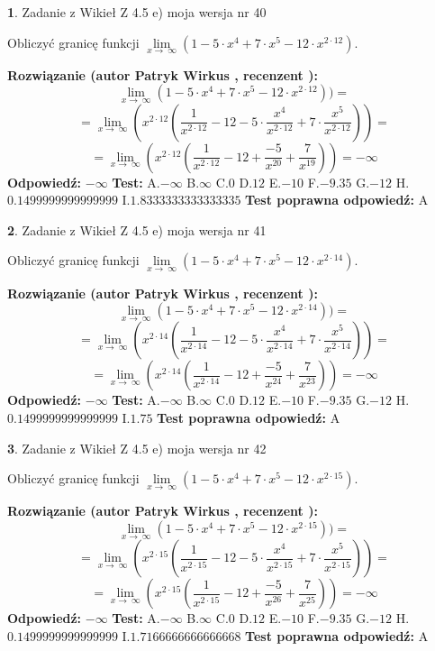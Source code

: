 \documentclass[12pt, a4paper]{article}
\theoremstyle{definition} %
\newtheorem{zad}{}
\newcommand{\zadStart}[1]{\begin{zad}#1\newline}
\newcommand{\zadStop}{\end{zad}}
\newcommand{\rozwStart}[2]{\noindent \textbf{Rozwiązanie (autor #1 , recenzent #2): }\newline}
\newcommand{\rozwStop}{\newline}
\newcommand{\odpStart}{\noindent \textbf{Odpowiedź:}\newline}
\newcommand{\odpStop}{\newline}
\newcommand{\testStart}{\noindent \textbf{Test:}\newline}
\newcommand{\testStop}{\newline}
\newcommand{\kluczStart}{\noindent \textbf{Test poprawna odpowiedź:}\newline}
\newcommand{\kluczStop}{\newline}
\begin{document}
\zadStart{Zadanie z Wikieł Z 4.5 e) moja wersja nr 40}


Obliczyć granicę funkcji  $\lim\limits_{x\to\ \infty}(1 - 5 \cdot x^{4}+7 \cdot x^{5}- 12 \cdot x^{2\cdot12})$.
\zadStop
\rozwStart{Patryk Wirkus}{}
$$\lim\limits_{x\to\ \infty}(1 - 5 \cdot x^{4}+7 \cdot x^{5}- 12 \cdot x^{2\cdot12}))=$$
$$=\lim\limits_{x\to\ \infty}(x^{2\cdot12}(\frac{1}{x^{2\cdot12}}-12 -5 \cdot \frac{x^{4}}{x^{2\cdot12}}+7 \cdot \frac{x^{5}}{x^{2\cdot12}}))=$$
$$=\lim\limits_{x\to\ \infty}(x^{2\cdot12}(\frac{1}{x^{2\cdot12}}-12 + \frac{-5}{x^{20}}+ \frac{7}{x^{19}}))=-\infty$$
\rozwStop
\odpStart
$-\infty$
\odpStop
\testStart
A.$-\infty$ B.$\infty$ C.$0$ D.$12$ E.$-10$
F.$-9.35$ G.$-12$
H.$0.1499999999999999$
I.$1.8333333333333335$
\testStop
\kluczStart
A
\kluczStop



\zadStart{Zadanie z Wikieł Z 4.5 e) moja wersja nr 41}


Obliczyć granicę funkcji  $\lim\limits_{x\to\ \infty}(1 - 5 \cdot x^{4}+7 \cdot x^{5}- 12 \cdot x^{2\cdot14})$.
\zadStop
\rozwStart{Patryk Wirkus}{}
$$\lim\limits_{x\to\ \infty}(1 - 5 \cdot x^{4}+7 \cdot x^{5}- 12 \cdot x^{2\cdot14}))=$$
$$=\lim\limits_{x\to\ \infty}(x^{2\cdot14}(\frac{1}{x^{2\cdot14}}-12 -5 \cdot \frac{x^{4}}{x^{2\cdot14}}+7 \cdot \frac{x^{5}}{x^{2\cdot14}}))=$$
$$=\lim\limits_{x\to\ \infty}(x^{2\cdot14}(\frac{1}{x^{2\cdot14}}-12 + \frac{-5}{x^{24}}+ \frac{7}{x^{23}}))=-\infty$$
\rozwStop
\odpStart
$-\infty$
\odpStop
\testStart
A.$-\infty$ B.$\infty$ C.$0$ D.$12$ E.$-10$
F.$-9.35$ G.$-12$
H.$0.1499999999999999$
I.$1.75$
\testStop
\kluczStart
A
\kluczStop



\zadStart{Zadanie z Wikieł Z 4.5 e) moja wersja nr 42}


Obliczyć granicę funkcji  $\lim\limits_{x\to\ \infty}(1 - 5 \cdot x^{4}+7 \cdot x^{5}- 12 \cdot x^{2\cdot15})$.
\zadStop
\rozwStart{Patryk Wirkus}{}
$$\lim\limits_{x\to\ \infty}(1 - 5 \cdot x^{4}+7 \cdot x^{5}- 12 \cdot x^{2\cdot15}))=$$
$$=\lim\limits_{x\to\ \infty}(x^{2\cdot15}(\frac{1}{x^{2\cdot15}}-12 -5 \cdot \frac{x^{4}}{x^{2\cdot15}}+7 \cdot \frac{x^{5}}{x^{2\cdot15}}))=$$
$$=\lim\limits_{x\to\ \infty}(x^{2\cdot15}(\frac{1}{x^{2\cdot15}}-12 + \frac{-5}{x^{26}}+ \frac{7}{x^{25}}))=-\infty$$
\rozwStop
\odpStart
$-\infty$
\odpStop
\testStart
A.$-\infty$ B.$\infty$ C.$0$ D.$12$ E.$-10$
F.$-9.35$ G.$-12$
H.$0.1499999999999999$
I.$1.7166666666666668$
\testStop
\kluczStart
A
\kluczStop
\end{document}
